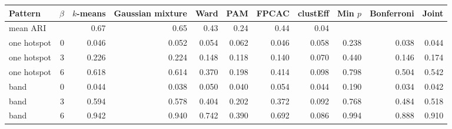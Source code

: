 \begin{tabular}{lrrrrrrr|rrr}
\toprule
Pattern & $\beta$ & $k$-means & Gaussian mixture & Ward & PAM & FPCAC & clustEff & Min $p$ & Bonferroni & Joint \\
\midrule
\multicolumn{2}{l}{mean ARI} & 0.67 & 0.65 & 0.43 & 0.24 & 0.44 & 0.04 & & & \\
\midrule
one hotspot & 0 & 0.046 & 0.052 & 0.054 & 0.062 & 0.046 & 0.058 & 0.238 & 0.038 & 0.044 \\
one hotspot & 3 & 0.226 & 0.224 & 0.148 & 0.118 & 0.140 & 0.070 & 0.440 & 0.146 & 0.174 \\
one hotspot & 6 & 0.618 & 0.614 & 0.370 & 0.198 & 0.414 & 0.098 & 0.798 & 0.504 & 0.542 \\
band & 0 & 0.044 & 0.038 & 0.050 & 0.040 & 0.054 & 0.044 & 0.190 & 0.034 & 0.042 \\
band & 3 & 0.594 & 0.578 & 0.404 & 0.202 & 0.372 & 0.092 & 0.768 & 0.484 & 0.518 \\
band & 6 & 0.942 & 0.940 & 0.742 & 0.390 & 0.692 & 0.086 & 0.994 & 0.888 & 0.910 \\
\bottomrule
\end{tabular}
